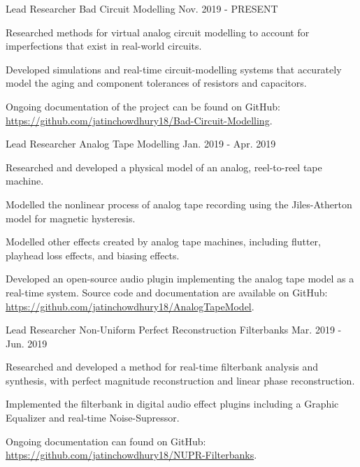 \begin{cventries}
    \cventry
    {Lead Researcher} %
    {Bad Circuit Modelling} %
    {} %
    {Nov. 2019 - PRESENT} %
    {
        \begin{cvitems}
              \item{Researched methods for virtual analog circuit modelling
                    to account for imperfections that exist in real-world circuits.}
              \item{Developed simulations and real-time circuit-modelling systems that
                    accurately model the aging and component tolerances of resistors and capacitors.}
              \item{Ongoing documentation of the project can be found on GitHub:
                    \url{https://github.com/jatinchowdhury18/Bad-Circuit-Modelling}.}
        \end{cvitems}
    }

    \cventry
    {Lead Researcher} %
    {Analog Tape Modelling} %
    {} %
    {Jan. 2019 - Apr. 2019} %
    {
        \begin{cvitems}
              \item{Researched and developed a physical model of an analog, reel-to-reel tape machine.}
              \item{Modelled the nonlinear process of analog tape recording using the Jiles-Atherton model for magnetic hysteresis.}
              \item{Modelled other effects created by analog tape machines, including flutter, playhead loss effects, and biasing effects.}
              \item{Developed an open-source audio plugin implementing the analog tape model as a real-time system.
                    Source code and documentation are available on GitHub: \url{https://github.com/jatinchowdhury18/AnalogTapeModel}.}
        \end{cvitems}
    }

    \cventry
    {Lead Researcher} %
    {Non-Uniform Perfect Reconstruction Filterbanks} %
    {} %
    {Mar. 2019 - Jun. 2019} %
    {
      \begin{cvitems} %
        \item {Researched and developed a method for real-time filterbank analysis and synthesis, with perfect magnitude reconstruction and linear phase reconstruction.}
        \item {Implemented the filterbank in digital audio effect plugins including a Graphic Equalizer and real-time Noise-Supressor.}
        \item {Ongoing documentation can found on GitHub: \url{https://github.com/jatinchowdhury18/NUPR-Filterbanks}.}
      \end{cvitems}
    }


\end{cventries}
